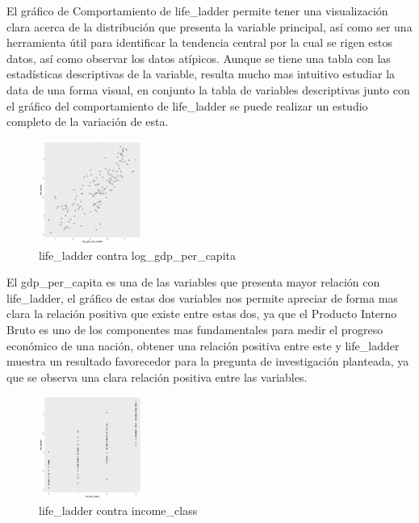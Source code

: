 El gráfico de Comportamiento de life\_ladder permite tener una visualización clara acerca de la distribución que presenta la variable principal, así como ser una herramienta útil para identificar la tendencia central por la cual se rigen estos datos, así como observar los datos atípicos. Aunque se tiene una tabla con las estadísticas descriptivas de la variable, resulta mucho mas intuitivo estudiar la data de una forma visual, en conjunto la tabla de variables descriptivas junto con el gráfico del comportamiento de life\_ladder se puede realizar un estudio completo de la variación de esta.
\newpage
\begin{figure}[!ht]
    \centering
    \includegraphics[width=0.3\textwidth]{figures/gdp_life.png}
    \caption{life\_ladder contra log\_gdp\_per\_capita}
    \label{fig:correlaciones2}
\end{figure}

El gdp\_per\_capita es una de las variables que presenta mayor relación con life\_ladder, el gráfico de estas dos variables nos permite apreciar de forma mas clara la relación positiva que existe entre estas dos, ya que el Producto Interno Bruto es uno de los componentes mas fundamentales para medir el progreso económico de una nación, obtener una relación positiva entre este y life\_ladder muestra un resultado favorecedor para la pregunta de investigación planteada, ya que se observa una clara relación positiva entre las variables.

\begin{figure}[!ht]
    \centering
    \includegraphics[width=0.3\textwidth]{figures/income_life.png}
    \caption{life\_ladder contra income\_class}
    \label{fig:correlaciones3}
\end{figure}

